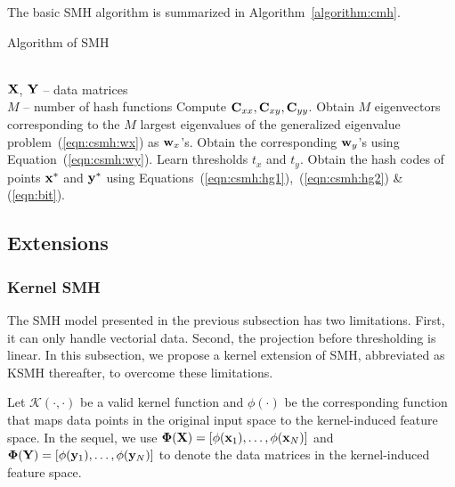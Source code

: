 %
%






The basic \mbox{SMH} algorithm is summarized in Algorithm~\ref{algorithm:cmh}.

\begin{algorithm}[ht]
\caption{Algorithm of \mbox{SMH}}
\label{algorithm:cmh}
\begin{algorithmic}
 \\
${\bf X}$, ${\bf Y}$ -- data matrices
\\ $M$ -- number of hash functions
\STATE Compute ${\bf C}_{xx},{\bf C}_{xy},{\bf C}_{yy}$.
\STATE Obtain $M$ eigenvectors corresponding to the $M$ largest eigenvalues of the generalized eigenvalue problem~(\ref{eqn:csmh:wx}) as ${\bf w}_{x}$'s.
 \STATE Obtain the corresponding ${\bf w}_{y}$'s using Equation~(\ref{eqn:csmh:wy}).
 \STATE Learn thresholds $ t_x $ and $ t_y $.
 \STATE Obtain the hash codes of points ${\bf x}^{*}$ and ${\bf y}^{*}$ using Equations~(\ref{eqn:csmh:hg1}),~(\ref{eqn:csmh:hg2}) \& (\ref{eqn:bit}).


\end{algorithmic}
\end{algorithm}

\subsection{Extensions}
\label{smh:Ssmh:EXT}

\subsubsection{Kernel \mbox{SMH}}
\label{smh:Ssmh:EXT:KSMH}

The \mbox{SMH} model presented in the previous subsection has two limitations.  First, it can only handle vectorial data.  Second, the projection before thresholding is linear.  In this subsection, we propose a kernel extension of \mbox{SMH}, abbreviated as \mbox{KSMH} thereafter, to overcome these limitations. %

Let $\mathcal{K}(\cdot,\cdot)$ be a valid kernel function and $\phi(\cdot)$ be the corresponding function that maps data points in the original input space to the kernel-induced feature space. In the sequel, we use $\mbox{\boldmath$\Phi$\unboldmath}({\bf X}) = [\phi({\bf x}_1),\dots,\phi({\bf x}_{N})]$ and $\mbox{\boldmath$\Phi$\unboldmath}({\bf Y}) = [\phi({\bf y}_1),\dots,\phi({\bf y}_{N})]$ to denote the data matrices in the kernel-induced feature space.

